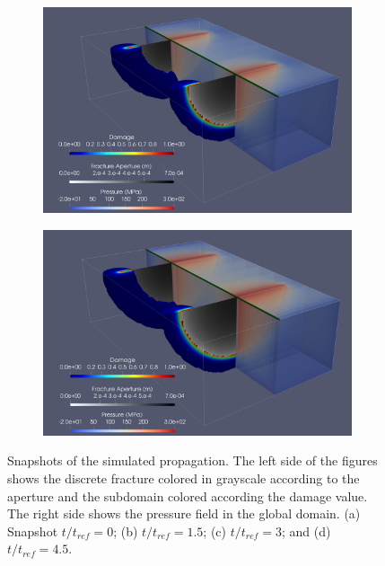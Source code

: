\begin{figure}[h]
\begin{subfigure}{.45\textwidth}
  \centering
  \includegraphics[width=\linewidth]{Chapter4/figures/3D/new_t_60.png}
  \caption{}
  \label{fig:parallel_t_2}
\end{subfigure}
\hspace{0.85cm}
\begin{subfigure}{.45\textwidth}
  \centering
  \includegraphics[width=\linewidth]{Chapter4/figures/3D/new_t_90.png}
  \caption{}
  \label{fig:parallel_t_3}
\end{subfigure}
  \caption{Snapshots of the simulated propagation. The left side of the figures shows the discrete fracture colored in grayscale according to the aperture and the subdomain colored according the damage value. The right side shows the pressure field in the global domain. (a) Snapshot $t/t_{ref} = 0$; (b) $t/t_{ref} = 1.5$; (c) $t/t_{ref} = 3$; and (d) $t/t_{ref} = 4.5$. } 
  \label{fig:parallel_snapshots}
\end{figure}

